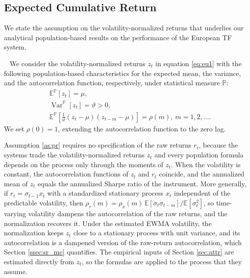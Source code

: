 \documentclass[hidelinks]{siamonline250211}
\DeclareMathOperator{\Var}{Var}
\begin{document}
\subsection{Expected Cumulative Return}


We state the assumption on the volatility-normalized returns that underlies our analytical population-based results on the performance of the European TF system.
\begin{assumption}\label{as:pr} ~
	We consider the volatility-normalized returns $z_{t}$ in equation \eqref{eq:eu1} with the following population-based characteristics for the expected mean, the variance, and the autocorrelation function, respectively, under statistical measure $\mathbb{P}$:
	\begin{equation} \label{eq:e15} 
		\begin{split}
			& \mathbb{E}^{\mathbb{P}} \left[ z_{t} \right] = \mu,\\
			& \Var^{\mathbb{P}} \left[ z_{t} \right] = \vartheta > 0,\\
			& \mathbb{E}^{\mathbb{P}} \left[ \frac{1}{\vartheta} (z_{t}-\mu)(z_{t-m}-\mu) \right] = \rho(m), \ m = 1, 2, \ldots.
		\end{split}
	\end{equation}
	We set $\rho(0)=1$, extending the autocorrelation function to the zero lag.
\end{assumption}

Assumption \ref{as:pr} requires no specification of the raw returns $r_{t}$, because the systems trade the volatility-normalized returns $z_{t}$ and every population formula depends on the process only through the moments of $z_{t}$. When the volatility is constant, the autocorrelation functions of $z_{t}$ and $r_{t}$ coincide, and the annualized mean of $z_{t}$ equals the annualized Sharpe ratio of the instrument. More generally, if $r_{t} = \sigma_{t-1} x_{t}$ with a standardized stationary process $x_{t}$ independent of the predictable volatility, then $\rho_{r}(m) = \rho_{x}(m)\,\mathbb{E}[\sigma_{t}\sigma_{t-m}]/\mathbb{E}[\sigma^{2}_{t}]$, so time-varying volatility dampens the autocorrelation of the raw returns, and the normalization recovers it. Under the estimated EWMA volatility, the normalization keeps $z_{t}$ close to a stationary process with unit variance, and its autocorrelation is a dampened version of the raw-return autocorrelation, which Section \ref{ssec:sr_mc} quantifies. The empirical inputs of Section \ref{sec:attr} are estimated directly from $z_{t}$, so the formulas are applied to the process that they assume.
\end{document}

